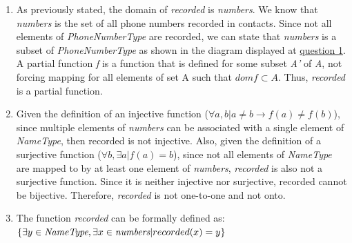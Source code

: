 \begin{enumerate}
\item As previously stated, the domain of \emph{recorded} is \emph{numbers}. We know that \emph{numbers} is the set of all phone numbers recorded in contacts. Since not all elements of \emph{PhoneNumberType} are recorded, we can
state that \emph{numbers} is a subset of \emph{PhoneNumberType} as shown in the diagram displayed at \underline{question 1}.
A partial function \emph{f} is a function that is defined for some subset \emph{A'} of \emph{A}, not forcing mapping for 
all elements of set A such that $dom f \subset A$. Thus, \emph{recorded} is a partial function.
\item Given the definition of an injective function ($\forall a, b | a \neq b \rightarrow f(a) \neq f(b) $), since multiple 
elements of \emph{numbers} can be associated with a single element of \emph{NameType}, then recorded is not injective. Also, 
given the definition of a surjective function ($\forall b,   \exists a | f(a) = b$), since not all elements of \emph{NameType} 
are mapped to by at least one element of \emph{numbers}, \emph{recorded} is also not a surjective function. Since it is 
neither injective nor surjective, recorded cannot be bijective. Therefore, \emph{recorded} is not one-to-one and not onto. 
\item The function \emph{recorded} can be formally defined as:\\
$\{ \exists y \in \emph{NameType},   \exists x \in \emph{numbers} | recorded(x) = y \}$
\end{enumerate}
